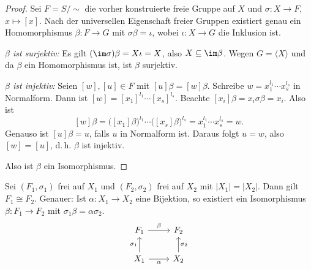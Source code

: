\documentclass[11pt]{article}
\begin{document}
\begin{proof}
  Sei $F = S/{\sim}$ die vorher konstruierte freie Gruppe auf $X$ und $\sigma\colon X \to F$, $x \mapsto [x]$. Nach der universellen Eigenschaft freier Gruppen existiert genau ein Homomorphismus $\beta\colon F \to G$ mit $\sigma\beta = \iota$, wobei $\iota\colon X \to G$ die Inklusion ist.

  \textit{$\beta$ ist surjektiv:} Es gilt $(\im\sigma)\beta = X\iota = X$, also $X \subseteq \im\beta$. Wegen $G = \langle X \rangle$ und da $\beta$ ein Homomorphismus ist, ist $\beta$ surjektiv.


  \textit{$\beta$ ist injektiv:} Seien $[w], [u] \in F$ mit $[u]\beta = [w]\beta$. Schreibe $w = x_1^{l_1} \cdots x_s^{l_s}$ in Normalform. Dann ist $[w] = [x_1]^{l_1} \cdots [x_s]^{l_s}$. Beachte $[x_i]\beta = x_i\sigma\beta = x_i$. Also ist
  \[ [w]\beta = \bigl([x_1]\beta\bigr)^{l_1} \cdots \bigl([x_s]\beta\bigr)^{l_s} = x_1^{l_1} \cdots x_s^{l_s} = w. \]
  Genauso ist $[u]\beta = u$, falls $u$ in Normalform ist. Daraus folgt $u = w$, also $[w] = [u]$, d.\,h. $\beta$ ist injektiv.

  Also ist $\beta$ ein Isomorphismus.
\end{proof}

\begin{theorem}\Theorem
  Sei $(F_1, \sigma_1)$ frei auf $X_1$ und $(F_2, \sigma_2)$ frei auf $X_2$ mit $\lvert X_1 \rvert = \lvert X_2 \rvert$. Dann gilt $F_1 \cong F_2$. Genauer: Ist $\alpha\colon X_1 \to X_2$ eine Bijektion, so existiert ein Isomorphismus $\beta\colon F_1 \to F_2$ mit $\sigma_1\beta = \alpha\sigma_2$.
  \[
    \begin{tikzcd}
      F_1 \arrow{r}{\beta} & F_2 \\
      X_1 \arrow{u}{\sigma_1} \arrow[swap]{r}{\alpha} & X_2 \arrow[swap]{u}{\sigma_2}
    \end{tikzcd}
  \]
\end{theorem}
\end{document}
